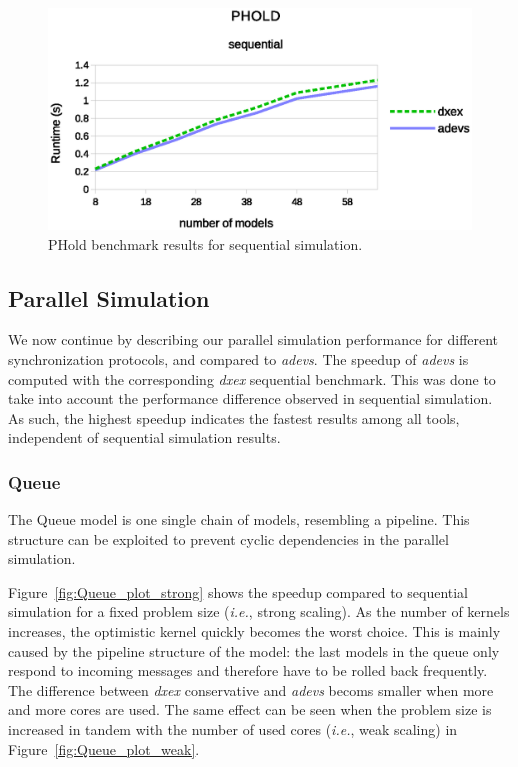 \begin{figure}
	\center
	\includegraphics[width=\columnwidth]{fig/phold_sequential.eps}
	\caption{PHold benchmark results for sequential simulation.}
	\label{fig:Phold_benchmark}
\end{figure}

\subsection{Parallel Simulation}
We now continue by describing our parallel simulation performance for different synchronization protocols, and compared to \textit{adevs}.
The speedup of \textit{adevs} is computed with the corresponding \textit{dxex} sequential benchmark.
This was done to take into account the performance difference observed in sequential simulation.
As such, the highest speedup indicates the fastest results among all tools, independent of sequential simulation results.

\subsubsection{Queue}
The Queue model is one single chain of models, resembling a pipeline.
This structure can be exploited to prevent cyclic dependencies in the parallel simulation.

Figure~\ref{fig:Queue_plot_strong} shows the speedup compared to sequential simulation for a fixed problem size (\textit{i.e.}, strong scaling).
As the number of kernels increases, the optimistic kernel quickly becomes the worst choice.
This is mainly caused by the pipeline structure of the model: the last models in the queue only respond to incoming messages and therefore have to be rolled back frequently.
The difference between \textit{dxex} conservative and \textit{adevs} becoms smaller when more and more cores are used.
The same effect can be seen when the problem size is increased in tandem with the number of used cores (\textit{i.e.}, weak scaling) in Figure~\ref{fig:Queue_plot_weak}.

